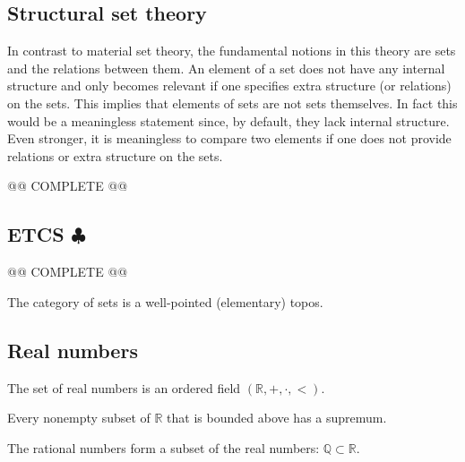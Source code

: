 \subsection{Structural set theory}

    In contrast to material set theory, the fundamental notions in this theory are sets and the relations between them. An element of a set does not have any internal structure and only becomes relevant if one specifies extra structure (or relations) on the sets. This implies that elements of sets are not sets themselves. In fact this would be a meaningless statement since, by default, they lack internal structure. Even stronger, it is meaningless to compare two elements if one does not provide relations or extra structure on the sets.

    @@ COMPLETE @@

\subsection{\texorpdfstring{ETCS $\clubsuit$}{ETCS}}

    @@ COMPLETE @@


    \begin{axiom}
        The category of sets is a well-pointed (elementary) topos.
    \end{axiom}

\subsection{Real numbers}

    \begin{axiom}[Ordering]
        The set of real numbers is an ordered field $(\mathbb{R},+,\cdot,<)$.
    \end{axiom}
    \begin{axiom}
        Every nonempty subset of $\mathbb{R}$ that is bounded above has a supremum.
    \end{axiom}

    \begin{axiom}
        The rational numbers form a subset of the real numbers: $\mathbb{Q}\subset\mathbb{R}$.
    \end{axiom}

